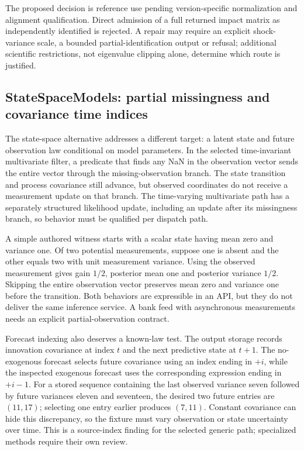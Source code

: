 The proposed decision is reference use pending version-specific normalization and alignment qualification. Direct admission of a full returned impact matrix as independently identified is rejected. A repair may require an explicit shock-variance scale, a bounded partial-identification output or refusal; additional scientific restrictions, not eigenvalue clipping alone, determine which route is justified.

\subsection{StateSpaceModels: partial missingness and covariance time indices}

The state-space alternative addresses a different target: a latent state and future observation law conditional on model parameters. In the selected time-invariant multivariate filter, a predicate that finds any NaN in the observation vector sends the entire vector through the missing-observation branch. The state transition and process covariance still advance, but observed coordinates do not receive a measurement update on that branch. The time-varying multivariate path has a separately structured likelihood update, including an update after its missingness branch, so behavior must be qualified per dispatch path.\citep{exec25_odyn_ssm}

A simple authored witness starts with a scalar state having mean zero and variance one. Of two potential measurements, suppose one is absent and the other equals two with unit measurement variance. Using the observed measurement gives gain $1/2$, posterior mean one and posterior variance $1/2$. Skipping the entire observation vector preserves mean zero and variance one before the transition. Both behaviors are expressible in an API, but they do not deliver the same inference service. A bank feed with asynchronous measurements needs an explicit partial-observation contract.\citep{exec25_odyn_ssm,exec25_odyn_choice}

Forecast indexing also deserves a known-law test. The output storage records innovation covariance at index $t$ and the next predictive state at $t+1$. The no-exogenous forecast selects future covariance using an index ending in $+i$, while the inspected exogenous forecast uses the corresponding expression ending in $+i-1$. For a stored sequence containing the last observed variance seven followed by future variances eleven and seventeen, the desired two future entries are $(11,17)$; selecting one entry earlier produces $(7,11)$. Constant covariance can hide this discrepancy, so the fixture must vary observation or state uncertainty over time. This is a source-index finding for the selected generic path; specialized methods require their own review.\citep{exec25_odyn_ssm,exec25_odyn_choice}

